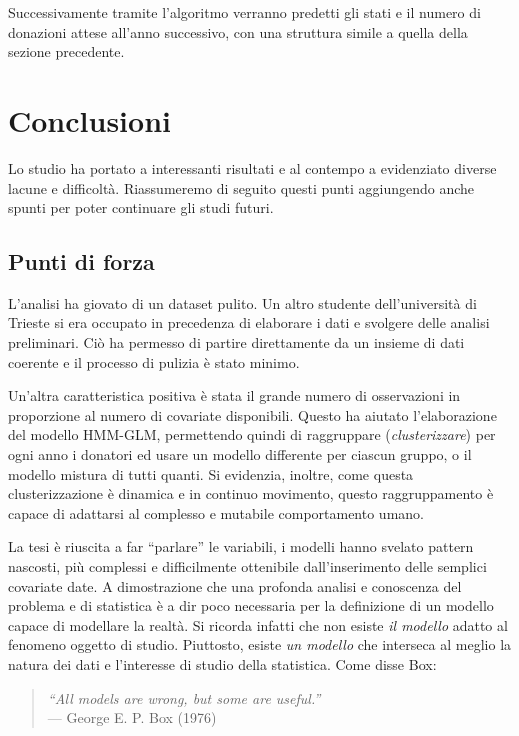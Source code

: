 \documentclass[
  italian,
  a4paper,
  a4paper,
  twoside,
  open=right,
  12pt]{scrbook}
\theoremstyle{definition}
\theoremstyle{remark}
\begin{document}
Successivamente tramite l'algoritmo verranno predetti gli stati e il
numero di donazioni attese all'anno successivo, con una struttura simile
a quella della sezione precedente.


\chapter{Conclusioni}\label{conclusioni}

Lo studio ha portato a interessanti risultati e al contempo a
evidenziato diverse lacune e difficoltà. Riassumeremo di seguito questi
punti aggiungendo anche spunti per poter continuare gli studi futuri.

\section{Punti di forza}\label{punti-di-forza}

L'analisi ha giovato di un dataset pulito. Un altro studente
dell'università di Trieste si era occupato in precedenza di elaborare i
dati e svolgere delle analisi preliminari. Ciò ha permesso di partire
direttamente da un insieme di dati coerente e il processo di pulizia è
stato minimo.

Un'altra caratteristica positiva è stata il grande numero di
osservazioni in proporzione al numero di covariate disponibili. Questo
ha aiutato l'elaborazione del modello HMM-GLM, permettendo quindi di
raggruppare (\emph{clusterizzare}) per ogni anno i donatori ed usare un
modello differente per ciascun gruppo, o il modello mistura di tutti
quanti. Si evidenzia, inoltre, come questa clusterizzazione è dinamica e
in continuo movimento, questo raggruppamento è capace di adattarsi al
complesso e mutabile comportamento umano.

La tesi è riuscita a far ``parlare'' le variabili, i modelli hanno
svelato pattern nascosti, più complessi e difficilmente ottenibile
dall'inserimento delle semplici covariate date. A dimostrazione che una
profonda analisi e conoscenza del problema e di statistica è a dir poco
necessaria per la definizione di un modello capace di modellare la
realtà. Si ricorda infatti che non esiste \emph{il modello} adatto al
fenomeno oggetto di studio. Piuttosto, esiste \emph{un modello} che
interseca al meglio la natura dei dati e l'interesse di studio della
statistica. Come disse Box:

\begin{quote}
\emph{``All models are wrong, but some are useful.''}\\
--- George E. P. Box (1976)
\end{quote}
\end{document}
